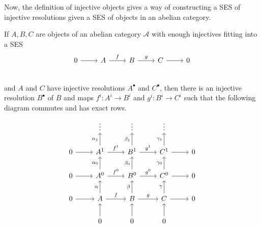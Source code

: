 Now, the definition of injective objects gives a way of constructing a SES
of injective resolutions given a SES of objects in an abelian category.
\begin{lemm}\label{lemm:ses_of_resolutions}
  If $A, B, C$ are objects of an abelian category $\mathcal{A}$ with enough
  injectives fitting into a SES
  \[\begin{tikzcd}
      0\rar & A\rar{f} & B\rar{g} & C\rar & 0 \\
    \end{tikzcd}\]
  and $A$ and $C$ have injective resolutions $A^{\bullet}$ and $C^{\bullet}$,
  then there is an injective resolution $B^{\bullet}$ of $B$ and maps
  $f^{i}:A^{i}\to B^{i}$ and $g^{i}:B^{i}\to C^{i}$ such that the following
  diagram commutes and has exact rows.
\[\begin{tikzcd}
    & \vdots & \vdots & \vdots & \\
    0\rar & A^{1}\rar{f^{1}}\uar{\alpha_{1}} & B^{1}\rar{g^{1}}\uar{\beta_{1}}
    & C^{1}\rar\uar{\gamma_{1}} & 0 \\
    0\rar & A^{0}\rar{f^{0}}\uar{\alpha_{0}} & B^{0}\rar{g^{0}}\uar{\beta_{0}}
    & C^{0}\rar\uar{\gamma_{0}} & 0 \\
    0\rar& A\rar{f}\uar{\alpha} & B\rar{g}\uar{\beta} & C\rar\uar{\gamma}&0\\
    & 0\uar & 0\uar & 0\uar &
  \end{tikzcd}\]
\end{lemm}
